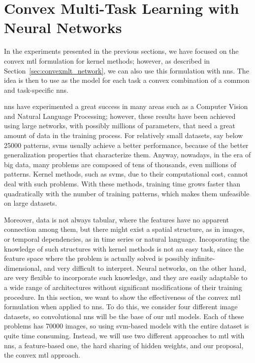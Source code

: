 \section{Convex Multi-Task Learning with Neural Networks}\label{sec:convexmtl_nn_experiments}
%
In the experiments presented in the previous sections, we have focused on the convex \acrshort{mtl} formulation for kernel methods; however, as described in Section~\ref{sec:convexmlt_network}, we can also use this formulation with \acrshort{nns}. The idea is then to use as the model for each task a convex combination of a common and task-specific \acrshort{nns}.

%
\acrshort{nns} have experimented a great success in many areas such as a Computer Vision and Natural Language Processing; however, these results have been achieved using large networks, with possibly millions of parameters, that need a great amount of data in the training process. For relatively small datasets, say below \num{25000} patterns, \acrshort{svms} usually achieve a better performance, because of the better generalization properties that characterize them.
%
Anyway, nowadays, in the era of big data, many problems are composed of tens of thousands, even millions of patterns. Kernel methods, such as \acrshort{svms}, due to their computational cost, cannot deal with such problems. With these methods, training time grows faster than quadratically with the number of training patterns, which makes them unfeasible on large datasets.
%

Moreover, data is not always tabular, where the features have no apparent connection among them, but there might exist a spatial structure, as in images, or temporal dependencies, as in time series or natural language. Incoporating the knowledge of such structures with kernel methods is not an easy task, since the feature space where the problem is actually solved is possibly infinite-dimensional, and very difficult to interpret. Neural networks, on the other hand, are very flexible to incorporate such knowledge, and they are easily adaptable to a wide range of architectures without significant modifications of their training procedure.
%
In this section, we want to show the effectiveness of the convex \acrshort{mtl} formulation when applied to \acrshort{nns}. To do this, we consider four different image datasets, so convolutional \acrshort{nns} will be the base of our \acrshort{mtl} models. Each of these problems has \num{70000} images, so using \acrshort{svm}-based models with the entire dataset is quite time consuming. Instead, we will use two different approaches to \acrshort{mtl} with \acrshort{nns}, a feature-based one, the hard sharing of hidden weights, and our proposal, the convex \acrshort{mtl} approach.


